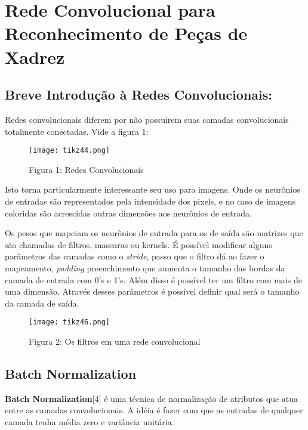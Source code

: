 






\section{Rede Convolucional para Reconhecimento de Peças de
Xadrez}\label{rede-convolucional}

    \subsection{Breve Introdução à Redes
Convolucionais:}\label{breve-introducao-a-redes-convolucionais}

Redes convolucionais diferem por não possuirem suas camadas
convolucionais totalmente conectadas. Vide a figura 1:

\begin{figure}[ht]
\centering
\texttt{[image: tikz44.png]}
\caption{Figura 1: Redes Convolucionais}
\end{figure}

Isto torna particularmente interessante seu uso para imagens. Onde os
neurônios de entradas são representados pela intensidade dos pixels, e
no caso de imagens coloridas são acrescidas outras dimensões aos
neurônios de entrada.

Os pesos que mapeiam os neurônios de entrada para os de saída são
matrizes que são chamadas de filtros, mascaras ou kernels. É possível
modificar alguns parâmetros das camadas como o \emph{stride}, passo que
o filtro dá ao fazer o mapeamento, \emph{padding} preenchimento que
aumenta o tamanho das bordas da camada de entrada com 0's e 1's. Além
disso é possível ter um filtro com mais de uma dimensão. Através desses
parâmetros é possível definir qual será o tamanho da camada de saída.

\begin{figure}[ht]
\centering
\texttt{[image: tikz46.png]}
\caption{Figura 2: Os filtros em uma rede convolucional}
\end{figure}

        \subsection{Batch Normalization}\label{batch-normalization}

\textbf{Batch Normalization}[4] é uma técnica de normalização de atributos que atua
entre as camadas convolucionais. A idéia é fazer com que as entradas de qualquer
camada tenha média zero e variância unitária.

